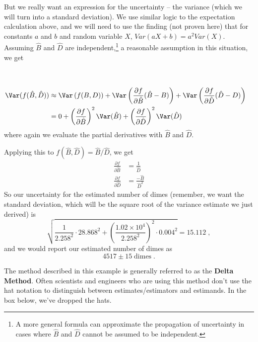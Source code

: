 \documentclass[twoside]{book}\usepackage[]{graphicx}\usepackage[]{xcolor}
\def\myindex#1{\index{#1}}
\def\term#1{\textbf{#1}}
\newcounter{example}[section]
\begin{document}
But we really want an expression for the uncertainty -- the variance (which we will turn into a standard deviation).  We use similar logic to the expectation calculation above, and we will need to use the finding (not proven here) that for constants $a$ and $b$ and random variable $X$, $Var(aX+b) = a^2 Var(X)$. Assuming $\hat B$ and $\hat D$ are independent,\footnote{A more general formula
can approximate the propagation of uncertainty in cases where $\hat B$ and $\hat D$ 
cannot be assumed to be independent.} a reasonable assumption in this situation,
we get
\begin{align*}
	\\[5mm]
\Var(f(\hat B,\hat D))
&\approx 
\Var\left(f( B, D)\right)
+
\Var\left( \frac{\partial f}{\partial \hat B} (\hat B - B) \right)
+
\Var\left( \frac{\partial f}{\partial \hat D} (\hat D - D) \right)
\\
&=
0 
+
\left(\frac{\partial f}{\partial \hat B}\right)^2 \Var(\hat B)
+
\left(\frac{\partial f}{\partial \hat D}\right)^2 \Var(\hat D)
\end{align*}
where again we evaluate the partial derivatives with $\hat{B}$ and $\hat{D}$.

Applying this to $f(\hat B,\hat D) = \hat B/\hat D$, we get
\begin{align*}
	\frac{\partial f}{\partial \hat B} &= \frac{1}{\hat D}
	\\
	\frac{\partial f}{\partial \hat D} &= \frac{-\hat B}{\hat D^2}
\end{align*}
So our uncertainty for the estimated number of dimes (remember, we want the standard deviation, which will be the square root of the variance estimate we just derived) is
\[
\sqrt{
\frac{1}{2.258^2} \cdot 28.868^2 
+ \left(\frac{\ensuremath{1.02\times 10^{4}}}{2.258^2}\right)^2 \cdot 0.004^2}
=
15.112 \;,
\]
and we would report our estimated number of dimes as 
\[ 
4517 \pm 15 \; \mbox{dimes} \;.
\]

\myindex{Delta Method|defidx}%
The method described in this example is generally referred to as the
\term{Delta Method}.  Often scientists and engineers who are using this method don't use the hat notation
to distinguish between estimates/estimators and estimands.  In the box below, we've 
dropped the hats.
\end{document}

